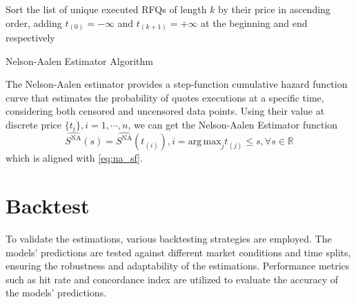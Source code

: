 \begin{algorithm}[h]
    Sort the list of unique executed RFQs of length $k$ by their price in ascending order, adding $t_{(0)} = -\infty$ and $t_{(k+1)} = +\infty$ at the beginning and end respectively\;
\caption{Nelson-Aalen Estimator Algorithm}
\end{algorithm}

The Nelson-Aalen estimator provides a step-function cumulative hazard function curve that estimates the probability of quotes executions at a specific time, considering both censored and uncensored data points. Using their value at discrete price $\{t_i\}, i = 1, \cdots, n$, we can get the Nelson-Aalen Estimator function
\[
    \widehat {S^{\text{NA}}}(s) = \widehat {S^{\text{NA}}}(t_{(i)}), i = \mathrm{arg\,max}_j t_{(j)}\leqslant s, \forall s \in \mathbb{R}
\]
which is aligned with \eqref{eq:na_sf}.

\section{Backtest}
To validate the estimations, various backtesting strategies are employed. The models' predictions are tested against different market conditions and time splits, ensuring the robustness and adaptability of the estimations. Performance metrics such as hit rate and concordance index are utilized to evaluate the accuracy of the models' predictions.

